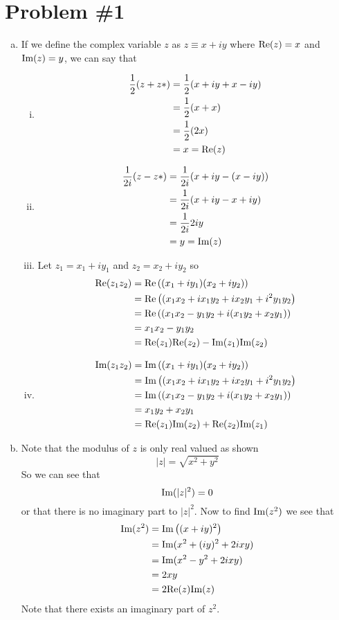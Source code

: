 \documentclass[11pt]{article}
\numberwithin{equation}{section}
\newcommand{\Img}{\textnormal{Im}}
\newcommand{\Real}{\textnormal{Re}}
\begin{document}


\section{Problem \#1}
\begin{enumerate}[(a)]
\item
If we define the complex variable $z$ as $z\equiv x+iy$ where
$\Real(z) = x$ and $\Img(z) = y$, we can say that
\begin{enumerate}[(i)]
\item
\begin{align*}
\frac{1}{2}(z+z*) &= \frac{1}{2}(x+iy+x-iy)\\
&= \frac{1}{2}(x+x)\\
&= \frac{1}{2}(2x)\\
&= x = \Real(z)
\end{align*}
\item
\begin{align*}
\frac{1}{2i}(z-z*) &= \frac{1}{2i}(x+iy-(x-iy))\\
&= \frac{1}{2i}(x+iy-x+iy)\\
&= \frac{1}{2i}2iy\\
&= y = \Img(z)
\end{align*}
\item
Let $z_1 = x_1+iy_1$ and $z_2 = x_2+iy_2$ so
\begin{align*}
\Real(z_1z_2) &= \Real\left((x_1+iy_1)(x_2+iy_2)\right)\\
&= \Real\left((x_1x_2+ix_1y_2+ix_2y_1+i^2y_1y_2\right)\\
&= \Real\left((x_1x_2-y_1y_2+i(x_1y_2+x_2y_1)\right)\\
&= x_1x_2-y_1y_2\\
&= \Real(z_1)\Real(z_2)-\Img(z_1)\Img(z_2)
\end{align*}
\item
\begin{align*}
\Img(z_1z_2) &= \Img\left((x_1+iy_1)(x_2+iy_2)\right)\\
&= \Img\left((x_1x_2+ix_1y_2+ix_2y_1+i^2y_1y_2\right)\\
&= \Img\left((x_1x_2-y_1y_2+i(x_1y_2+x_2y_1)\right)\\
&= x_1y_2+x_2y_1\\
&= \Real(z_1)\Img(z_2)+\Real(z_2)\Img(z_1)
\end{align*}
\end{enumerate}

\item
Note that the modulus of $z$ is only real valued as shown
$$|z| = \sqrt{x^2+y^2}$$
So we can see that 
$$\Img(|z|^2) = 0$$
or that there is no imaginary part to $|z|^2$. Now to find $\Img(z^2)$ we see that 
\begin{align*}
\Img(z^2) &= \Img\left((x+iy)^2\right)\\
&= \Img(x^2+(iy)^2+2ixy)\\
&= \Img(x^2-y^2+2ixy)\\
&= 2xy\\
&= 2\Real(z)\Img(z)
\end{align*}
Note that there exists an imaginary part of $z^2$. 


\end{enumerate}
\end{document}
